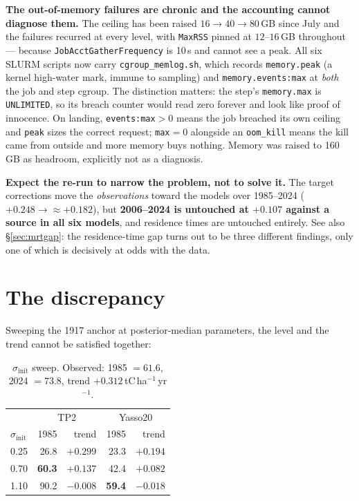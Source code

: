 \documentclass[11pt]{article}
\newcommand{\sinit}{\sigma_{\mathrm{init}}}
\begin{document}
\textbf{The out-of-memory failures are chronic and the accounting cannot diagnose them.} The
ceiling has been raised $16\rightarrow40\rightarrow80$\,GB since July and the failures recurred at
every level, with \texttt{MaxRSS} pinned at $12$--$16$\,GB throughout --- because
\texttt{JobAcctGatherFrequency} is 10\,s and cannot see a peak. All six SLURM scripts now carry
\texttt{cgroup\_memlog.sh}, which records \texttt{memory.peak} (a kernel high-water mark, immune to
sampling) and \texttt{memory.events:max} at \emph{both} the job and step cgroup. The distinction
matters: the step's \texttt{memory.max} is \texttt{UNLIMITED}, so its breach counter would read
zero forever and look like proof of innocence. On landing, \texttt{events:max}${}>0$ means the job
breached its own ceiling and \texttt{peak} sizes the correct request; \texttt{max}${}=0$ alongside
an \texttt{oom\_kill} means the kill came from outside and more memory buys nothing. Memory was
raised to 160\,GB as headroom, explicitly not as a diagnosis.

\begin{caveat}
\textbf{Expect the re-run to narrow the problem, not to solve it.} The target corrections move the
\emph{observations} toward the models over 1985--2024 ($+0.248 \rightarrow \approx +0.182$), but
\textbf{2006--2024 is untouched at $+0.107$ against a source in all six models}, and residence times
are untouched entirely. See also \S\ref{sec:mrtgap}: the residence-time gap turns out to be three different
findings, only one of which is decisively at odds with the data.
\end{caveat}

\section{The discrepancy}

Sweeping the 1917 anchor at posterior-median parameters, the level and the trend cannot be
satisfied together:

\begin{table}[H]\centering\small
\caption{$\sinit$ sweep. Observed: 1985 $=61.6$, 2024 $=73.8$, trend $+0.312$\,tC\,ha$^{-1}$\,yr$^{-1}$.}
\begin{tabular}{lrr|rr}
\toprule
 & \multicolumn{2}{c|}{TP2} & \multicolumn{2}{c}{Yasso20}\\
$\sinit$ & 1985 & trend & 1985 & trend\\
\midrule
0.25 & 26.8 & $+0.299$ & 23.3 & $+0.194$\\
0.70 & \textbf{60.3} & $+0.137$ & 42.4 & $+0.082$\\
1.10 & 90.2 & $-0.008$ & \textbf{59.4} & $-0.018$\\
\bottomrule
\end{tabular}
\end{table}
\end{document}
